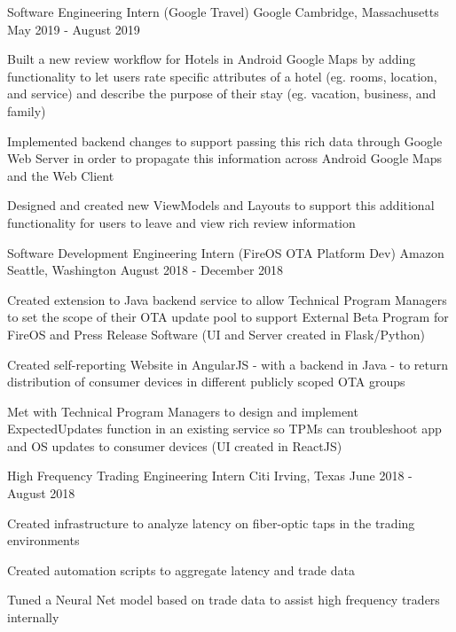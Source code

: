 \documentclass[
    changecolor={0, 38, 58},
]{pranav-resume}
\begin{document}
\cventry
  {Software Engineering Intern (Google Travel)}
  {Google}
  {Cambridge, Massachusetts}
  {May 2019 - August 2019}
  {
    \begin{cvitems}
        \item {Built a new review workflow for Hotels in Android Google Maps by adding functionality to let users rate specific attributes of a hotel (eg. rooms, location, and service) and describe the purpose of their stay (eg. vacation, business, and family)}
        \item {Implemented backend changes to support passing this rich data through Google Web Server in order to propagate this information across Android Google Maps and the Web Client}
        \item {Designed and created new ViewModels and Layouts to support this additional functionality for users to leave and view rich review information}
  \end{cvitems}
  }
\cventry
  {Software Development Engineering Intern (FireOS OTA Platform Dev)}
  {Amazon}
  {Seattle, Washington}
  {August 2018 - December 2018}
  {
    \begin{cvitems}
     	 \item {Created extension to Java backend service to allow Technical Program Managers to set the scope of their OTA update pool to support External Beta Program for FireOS and Press Release Software (UI and Server created in Flask/Python) }
	\item {Created self-reporting Website in AngularJS - with a backend in Java - to return distribution of consumer devices in different publicly scoped OTA groups }
	\item {Met with Technical Program Managers to design and implement ExpectedUpdates function in an existing service so TPMs can troubleshoot app and OS updates to consumer devices (UI created in ReactJS)}
    \end{cvitems}
  }
\cventry
  {High Frequency Trading Engineering Intern}
  {Citi}
  {Irving, Texas}
  {June 2018 - August 2018}
  {
    \begin{cvitems}
	\item{Created infrastructure to analyze latency on fiber-optic taps in the trading environments}
	\item{Created automation scripts to aggregate latency and trade data}
	\item{Tuned a Neural Net model based on trade data to assist high frequency traders internally}
    \end{cvitems}
  }
\end{document}

